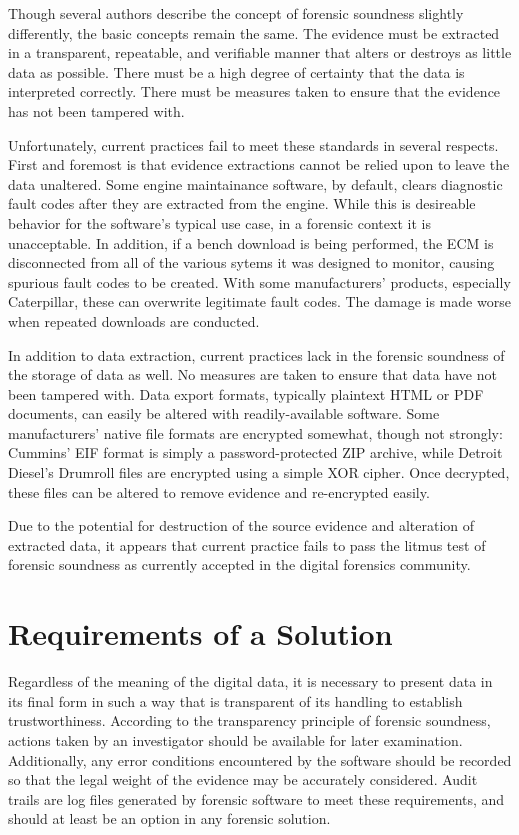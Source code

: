 \documentclass{report}
\begin{document}
Though several authors describe the concept of forensic soundness slightly differently, the basic concepts remain the same. The evidence must be extracted in a transparent,
repeatable, and verifiable manner that alters or destroys as little data as possible. There must be a high degree of certainty that the data is interpreted correctly. There must
be measures taken to ensure that the evidence has not been tampered with.

Unfortunately, current practices fail to meet these standards in several respects. First and foremost is that evidence extractions cannot be relied upon to leave the data unaltered.
Some engine maintainance software, by default, clears diagnostic fault codes after they are extracted from the engine. While this is desireable behavior for the software's typical
use case, in a forensic context it is unacceptable. In addition, if a bench download is being performed, the ECM is disconnected from all of the various sytems it was designed to monitor,
causing spurious fault codes to be created. With some manufacturers' products, especially Caterpillar, these can overwrite legitimate fault codes. The damage is made worse when
repeated downloads are conducted.

In addition to data extraction, current practices lack in the forensic soundness of the storage of data as well. No measures are taken to ensure that data have not been tampered
with. Data export formats, typically plaintext HTML or PDF documents, can easily be altered with readily-available software. Some manufacturers' native file formats are encrypted
somewhat, though not strongly: Cummins' EIF format is simply a password-protected ZIP archive, while Detroit Diesel's Drumroll files are encrypted using a simple XOR cipher.
Once decrypted, these files can be altered to remove evidence and re-encrypted easily.

Due to the potential for destruction of the source evidence and alteration of extracted data, it appears that current practice fails to pass the litmus test of forensic soundness
as currently accepted in the digital forensics community.

\chapter{Requirements of a Solution}

Regardless of the meaning of the digital data, it is necessary to present data in its final form in such a way that is transparent of its handling to establish trustworthiness. 
According to the transparency principle of forensic soundness, actions taken by an investigator should be available for later examination. Additionally, any error conditions 
encountered by the software should be recorded so that the legal weight of the evidence may be accurately considered. Audit trails are log files generated by forensic software 
to meet these requirements, and should at least be an option in any forensic solution.
\end{document}
